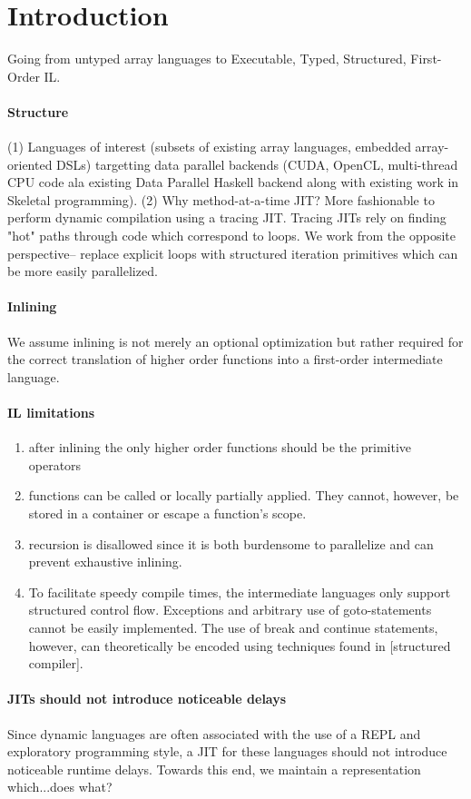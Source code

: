 \documentclass[preprint]{sigplanconf}
\begin{document}
\section{Introduction}

Going from untyped array languages to Executable, Typed, Structured, First-Order IL. 

\paragraph*{Structure}
(1) Languages of interest (subsets of existing array languages, 
  embedded array-oriented DSLs) targetting data parallel backends (CUDA, OpenCL, multi-thread CPU code ala 
  existing Data Parallel Haskell backend along with existing work in Skeletal programming). 
(2) Why method-at-a-time JIT? More fashionable to perform dynamic compilation using a tracing JIT. Tracing JITs 
rely on finding "hot" paths through code which correspond to loops. We work from the opposite perspective-- 
replace explicit loops with structured iteration primitives which can be more easily parallelized. 
\paragraph*{Inlining}
We assume inlining is not merely an optional optimization but rather required for the correct translation of
higher order functions into a first-order intermediate language. 
\paragraph*{IL limitations} 
\begin{enumerate}
\item after inlining the only higher order functions should be the primitive operators
\item functions can be called or locally partially applied. They cannot, however, be stored in a container or escape a function's scope. 
\item recursion is disallowed since it is both burdensome to parallelize and can prevent exhaustive inlining. 
\item To facilitate speedy compile times, the intermediate languages only support structured control flow. Exceptions and arbitrary use of goto-statements cannot be easily implemented. The use of break and continue statements, however, can theoretically be encoded using techniques found in [structured compiler]. 
\end{enumerate}
\paragraph*{JITs should not introduce noticeable delays}
Since dynamic languages are often associated with the use of a REPL and exploratory programming style, a JIT for these languages should not introduce noticeable runtime delays. Towards this end, we maintain a representation which...does what? 
\end{document}
